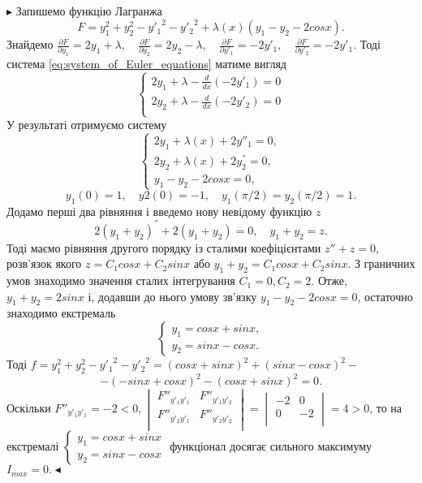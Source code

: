 \documentclass[a4paper]{article}
\begin{document}
	$\blacktriangleright$ Запишемо функцію Лагранжа
	$$F = y_1^2 + y_2^2 - {y'_1}^{2} - {y'_2}^{2} + \lambda(x)(y_1 - y_2 - 2cosx).$$
	Знайдемо $\frac{\partial F}{\partial y_1} = 2y_1 + \lambda, \quad
		\frac{\partial F}{\partial y_2} = 2y_2 - \lambda, \quad
		\frac{\partial F}{\partial y'_1} = -2y'_1, \quad
		\frac{\partial F}{\partial y'_2} = -2y'_1$. 
	Тоді система \eqref{eq:system_of_Euler_equations} матиме вигляд
	$$\begin{cases}
		2y_1 + \lambda - \frac{d}{dx}\left(-2y'_1\right) = 0 \\
		2y_2 + \lambda - \frac{d}{dx}\left(-2y'_2\right) = 0 \\
	\end{cases}$$
	У результаті отримуємо систему 
	$$\begin{cases}
		2y_1 + \lambda(x) + 2y''_1 = 0, \\
		2y_2 + \lambda(x) + 2y_2^{''} = 0, \\
		y_1 - y_2 - 2cosx = 0,
	\end{cases}$$
	$$y_1(0) = 1,\quad y2(0) = -1,\quad y_1(\pi/2) = y_2(\pi/2) = 1.$$
	Додамо перші два рівняння і введемо нову невідому функцію $z$
	$$2(y_1 + y_2)^{''} + 2(y_1 + y_2) = 0, \quad y_1 + y_2 = z.$$
	Тоді маємо рівняння другого порядку із сталими коефіцієнтами $z'' + z = 0$,
	розв’язок якого $z = C_1cosx + C_2sinx$ або $y_1 + y_2 = C_1cosx + C_2sinx$.
	З граничних умов  знаходимо значення сталих інтегрування $C_1 = 0, C_2 = 2$. Отже,
	$y_1 + y_2 = 2 sinx$ і, додавши до нього умову зв’язку $y_1 - y_2 - 2cosx = 0$, остаточно
	знаходимо екстремаль
	$$\begin{cases}
		y_1 = cosx + sinx,\\
		y_2 = sinx - cosx.
	\end{cases}$$
	Тоді $f = y_1^{2} + y_2^{2} - {y'_1}^{2} -{y'_2}^{2} = (cosx + sinx)^2 + (sinx - cosx)^2 - $ 
		$$-(-sinx + cosx)^2 - (cosx + sinx)^2 = 0.$$
	Оскільки $F''_{y'_1y'_1} = -2 < 0,
	\begin{vmatrix}
		F''_{y'_1y'_1} & F''_{y'_1y'_2} \\
		F''_{y'_2y'_1} & F''_{y'_2y'_2} \\
	\end{vmatrix} =
	\begin{vmatrix}
		-2 & 0 \\
		0 & -2 \\
	\end{vmatrix} = 4 > 0 $, то на екстремалі
	$\begin{cases}
		y_1 = cosx + sinx  \\
		y_2 = sinx - cosx
	\end{cases}$ функціонал досягає сильного максимуму $I_{max}= 0.\blacktriangleleft$
\end{document}
